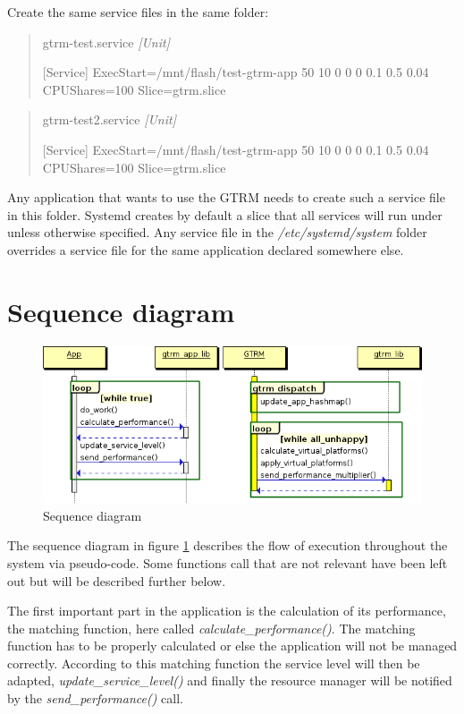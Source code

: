 \documentclass[nobiblatex]{LTHthesis}
\begin{document}
Create the same service files in the same folder:
\begin{quotation}
gtrm-test.service
\em
[Unit]

[Service]
ExecStart=/mnt/flash/test-gtrm-app 50 10 0 0 0 0.1 0.5 0.04\newline
CPUShares=100
Slice=gtrm.slice
\end{quotation}

\begin{quotation}
gtrm-test2.service
\em
[Unit]

[Service]
ExecStart=/mnt/flash/test-gtrm-app 50 10 0 0 0 0.1 0.5 0.04\newline
CPUShares=100
Slice=gtrm.slice
\end{quotation}

Any application that wants to use the GTRM needs to create such a service file in this folder.
Systemd creates by default a slice that all services will run under unless otherwise specified. Any service file in the \emph{/etc/systemd/system} folder overrides a service file for the 
same application declared somewhere else.




\section{Sequence diagram}
\begin{figure}
    \centering
    \includegraphics[width=\textwidth]{diag.png}
    \caption{Sequence diagram}
    \label{fig:sdiag}
\end{figure}
The sequence diagram in figure \ref{fig:sdiag} describes the flow of execution throughout the system via pseudo-code. Some functions call that are not relevant have been left out but will be described further below. 

The first important part in the application is the calculation of its performance, the matching function, here called \emph{calculate\_performance()}. The matching function has to be properly calculated or else the application will not be managed correctly. According to this matching function the service level will then be adapted, \emph{update\_service\_level()} and finally the resource manager will be notified by the \emph{send\_performance()} call.
\end{document}
